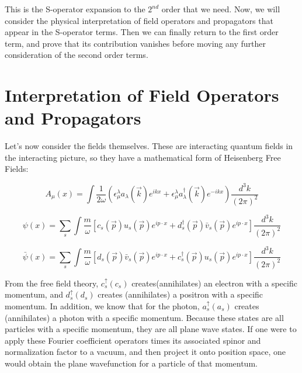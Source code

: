 \documentclass[a4]{article}
\begin{document}
        This is the S-operator expansion to the $2^{nd}$ order that we need. Now, we will consider the physical interpretation of field operators and propagators that appear
        in the S-operator terms. Then we can finally return to the first order term, and prove that its contribution vanishes before moving any further consideration of the
        second order terms.
        
    \section{Interpretation of Field Operators and Propagators}

    Let's now consider the fields themselves. These are interacting quantum fields in the interacting picture, so they have a mathematical form of Heisenberg Free Fields:

    \begin{equation}
        A_{\mu} (x) = \int \frac{1}{2 \omega} (\epsilon^{\lambda}_{\mu} a_{\lambda} (\vec{k}) e^{i k x} + \epsilon^{\lambda}_{\mu} a_{\lambda}^{\dag} (\vec{k}) e^{-i k x} ) \frac{d^3k}{(2 \pi)^2}
    \end{equation}

    \begin{equation}
        \psi (x) = \sum_{s} \int \frac{m}{\omega} [c_{s} (\vec{p}) u_{s} (\vec{p}) e^{ip \cdot x} + d_{s}^{\dagger} (\vec{p}) \bar{v}_{s} (\vec{p}) e^{ip \cdot x}] \frac{d^3k}{(2 \pi)^2}
    \end{equation}

    \begin{equation}
        \bar{\psi} (x) = \sum_{s} \int \frac{m}{\omega} [d_{s} (\vec{p}) \bar{v}_{s} (\vec{p}) e^{ip \cdot x} + c_{s}^{\dagger} (\vec{p}) u_{s} (\vec{p}) e^{ip \cdot x}] \frac{d^3k}{(2 \pi)^2}
    \end{equation}

    From the free field theory, $c^{\uparrow}_{s} (c_{s})$ creates(annihilates) an electron with a specific momentum, and $d^{\uparrow}_{s} (d_{s})$ creates (annihilates) a
    positron with a specific momentum. In addition, we know that for the photon, $a^{\uparrow}_{s} (a_{s})$ creates (annihilates) a photon with a specific momentum. Because
    these states are all particles with a specific momentum, they are all plane wave states. If one were to apply these Fourier coefficient operators times its associated
    spinor and normalization factor to a vacuum, and then project it onto position space, one would obtain the plane wavefunction for a particle of that momentum. 
\end{document}
